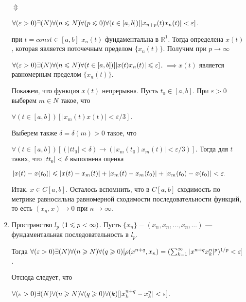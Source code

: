 \begin{enumerate}
          \hspace*{30mm}$\Updownarrow$

          $\forall(\varepsilon > 0)\exists(N )\forall( n \leqslant  N )\forall( p \leqslant  0)\forall( t \in
              [a, b])[|x_{n+p}(t) x_n(t)|<\varepsilon]$.

          \Rightarrow при $t=const \in [a, b]$ ${x_n(t)}$ фундаментальна в $\mathbb{R}^1$.
          Тогда определена $x(t)$, которая является
          поточечным пределом $\{x_n(t)\}$. Получим при $p \rightarrow \infty $

          $\forall( \varepsilon > 0)\exists(N )\forall( n \leqslant  N )\forall( t \in  [a, b])[
                  |x(t) x_n(t)| \leqslant  \varepsilon]$.
          $\implies  x(t)$ является равномерным пределом $\{x_n(t)\}$.

          Покажем, что функция $x(t)$ непрерывна. Пусть $t_0 \in  [a, b]$.
          При $\varepsilon > 0$ выберем $m \in  N$ такое, что

          $\forall( t \in  [a, b]) [ |x_m(t) x(t)| < \varepsilon/3]$.

          Выберем также $\delta = \delta(m) > 0$ такое, что

          $\forall( t \in  [a, b]) [ (|t t_0| < \delta) \rightarrow (|x_m(t_0) x_m(t)| < \varepsilon/3)]$.
          Тогда для $t$ таких, что $|t t_0| < \delta$ выполнена оценка

          $|x(t) -x(t_0)| \leqslant  |x(t)- x_m(t)| + |x_m(t) -x_m(t_0)| + |x_m(t_0)- x(t_0)| <
              \varepsilon.$

          Итак, $x \in  C[a, b]$. Осталось вспомнить, что в $C[a, b]$ сходимость по метрике
          равносильна равномерной сходимости последовательности функций, то есть
          $(x_n, x) \rightarrow 0 \text{ при } n \rightarrow \infty $.
    \item Пространство $l_p$ $(1 \leqslant  p < \infty )$.
          Пусть $\{x_n \}= (x_n, x_n, \dots , x_n, \dots)$
          — фундаментальная последовательность в $l_p.$

          Тогда $\forall( \varepsilon > 0)\exists(N )\forall( n \geqslant  N )
              \forall( q \geqslant  0)[\rho(x^{n+q}, x_n) =  (\sum^\infty_{k=1} |x^{n+q}
              x^n_k|^p )^{1/p}<\varepsilon]$.


          Отсюда следует, что

          $\forall( \varepsilon > 0)\exists(N )\forall( n \geqslant  N )\forall( q \geqslant  0)
              \forall( k)[|x^{n+q}_k - x^n_k| < \varepsilon]$.


\end{enumerate}
